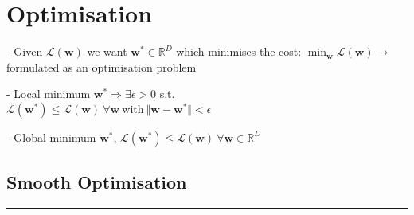 \section{Optimisation}

- Given $\mathcal{L}(\mathbf{w})$ we want $\mathbf{w^*} \in \mathbb{R}^D$ which minimises the cost: $\min_\mathbf{w} \mathcal{L}(\mathbf{w}) \rightarrow$ formulated as an optimisation problem

- Local minimum $\mathbf{w^*} \Rightarrow \exists \epsilon > 0$ s.t. \\
$\mathcal{L}(\mathbf{w^*}) \leq \mathcal{L}(\mathbf{w}) \ \forall \mathbf{w} \ \mathrm{with} \ \Vert \mathbf{w}-\mathbf{w^*} \Vert < \epsilon$

- Global minimum $\mathbf{w^*}$,
$\mathcal{L}(\mathbf{w^*}) \leq \mathcal{L}(\mathbf{w}) \ \forall \mathbf{w} \in \mathbb{R}^D$

\subsection{Smooth Optimisation}

\vspace{4pt}
\hrule
\vspace{4pt}